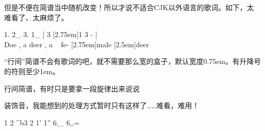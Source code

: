 \documentclass[11pt,fontset=ubuntu]{ctexart}
\begin{document}
但是不便在简谱当中随机改变！所以才说不适合CJK以外语言的歌词。如下，太难看了、太麻烦了。

\begin{tcblisting}{}
\setjpnotewidth{1.5em}
\begin{jianpu}
1. {2_} 3. {1_} | 3 {[2.75em]1} 3 - | \\
\small {Doe} , a {deer} , a ~ {fe-} {[2.75em]male} {[2.5em]deer}
\end{jianpu}
\end{tcblisting}

“行间”简谱不会有歌词的吧，就不需要那么宽的盒子，默认宽度0.75em。有升降号的符则至少1em。

\begin{tcblisting}{}
行间简谱，有时只是要拿一段旋律出来说说
\end{tcblisting}

装饰音，我能想到的处理方式暂时只有这样了……难看，难用！

\begin{tcblisting}{}
\begin{jianpu}
1 2 {\slurB[0.2ex][0.25em]} {^b3} 2  {\slurB[2pt]} {1'} {1''} {\slurE[5pt]} {6,_} {6,,=}
\end{jianpu}
\end{tcblisting}
\end{document}
